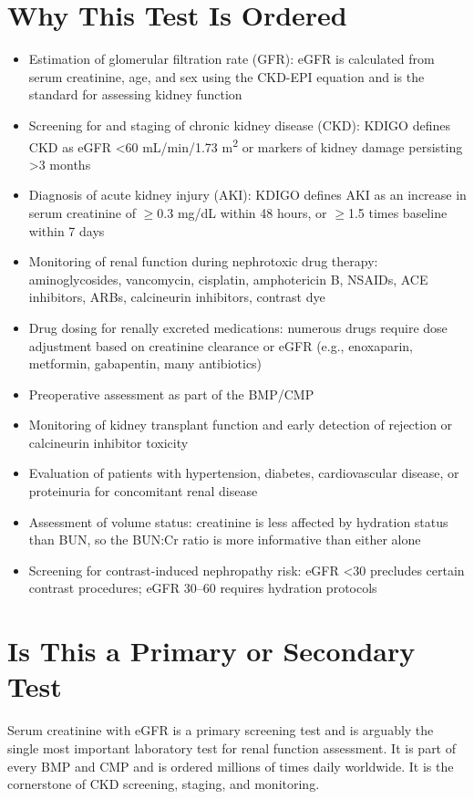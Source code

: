 \section*{Why This Test Is Ordered}
\begin{itemize}
  \item Estimation of glomerular filtration rate (GFR): eGFR is calculated from serum creatinine, age, and sex using the CKD-EPI equation and is the standard for assessing kidney function
  \item Screening for and staging of chronic kidney disease (CKD): KDIGO defines CKD as eGFR <60 mL/min/1.73 m\textsuperscript{2} or markers of kidney damage persisting >3 months
  \item Diagnosis of acute kidney injury (AKI): KDIGO defines AKI as an increase in serum creatinine of $\geq$0.3 mg/dL within 48 hours, or $\geq$1.5 times baseline within 7 days
  \item Monitoring of renal function during nephrotoxic drug therapy: aminoglycosides, vancomycin, cisplatin, amphotericin B, NSAIDs, ACE inhibitors, ARBs, calcineurin inhibitors, contrast dye
  \item Drug dosing for renally excreted medications: numerous drugs require dose adjustment based on creatinine clearance or eGFR (e.g., enoxaparin, metformin, gabapentin, many antibiotics)
  \item Preoperative assessment as part of the BMP/CMP
  \item Monitoring of kidney transplant function and early detection of rejection or calcineurin inhibitor toxicity
  \item Evaluation of patients with hypertension, diabetes, cardiovascular disease, or proteinuria for concomitant renal disease
  \item Assessment of volume status: creatinine is less affected by hydration status than BUN, so the BUN:Cr ratio is more informative than either alone
  \item Screening for contrast-induced nephropathy risk: eGFR <30 precludes certain contrast procedures; eGFR 30--60 requires hydration protocols
\end{itemize}

\section*{Is This a Primary or Secondary Test}
Serum creatinine with eGFR is a primary screening test and is arguably the single most important laboratory test for renal function assessment. It is part of every BMP and CMP and is ordered millions of times daily worldwide. It is the cornerstone of CKD screening, staging, and monitoring.

